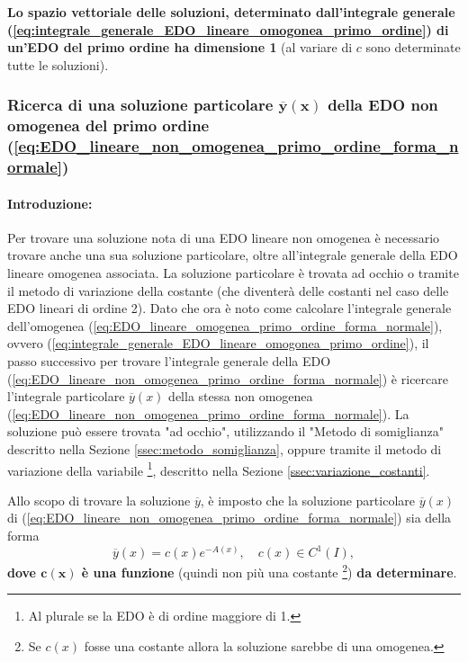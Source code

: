 \begin{remark}
    \textbf{Lo spazio vettoriale delle soluzioni, determinato dall'integrale generale (\ref{eq:integrale_generale_EDO_lineare_omogonea_primo_ordine}) di un'EDO del primo ordine ha dimensione 1} (al variare di $c$ sono determinate tutte le soluzioni).
\end{remark}

\subsubsection{Ricerca di una soluzione particolare \texorpdfstring{$\boldsymbol{\overline{y}(x)}$}{y(x)} della EDO non omogenea del primo ordine (\ref{eq:EDO_lineare_non_omogenea_primo_ordine_forma_normale})}
\paragraph{Introduzione:} Per trovare una soluzione nota di una EDO lineare non omogenea è necessario trovare anche una sua soluzione particolare, oltre all'integrale generale della EDO lineare omogenea associata. La soluzione particolare è trovata ad occhio o tramite il metodo di variazione della costante (che diventerà delle costanti nel caso delle EDO lineari di ordine 2).
Dato che ora è noto come calcolare l'integrale generale dell'omogenea (\ref{eq:EDO_lineare_omogenea_primo_ordine_forma_normale}), ovvero (\ref{eq:integrale_generale_EDO_lineare_omogonea_primo_ordine}), il passo successivo per trovare l'integrale generale della EDO (\ref{eq:EDO_lineare_non_omogenea_primo_ordine_forma_normale}) è ricercare l'integrale particolare $\overline{y}(x)$ della stessa non omogenea (\ref{eq:EDO_lineare_non_omogenea_primo_ordine_forma_normale}). La soluzione può essere trovata "ad occhio", utilizzando il "Metodo di somiglianza" descritto nella Sezione \ref{ssec:metodo_somiglianza}, oppure tramite il metodo di variazione della variabile \footnote{Al plurale se la EDO è di ordine maggiore di 1.}, descritto nella Sezione \ref{ssec:variazione_costanti}.

Allo scopo di trovare la soluzione $\overline y$, è imposto che la soluzione particolare $\overline{y}(x)$ di (\ref{eq:EDO_lineare_non_omogenea_primo_ordine_forma_normale}) sia della forma 
\begin{equation}\label{eq:forma_soluzione_paricolare_edo_non_omogenea_ordine_1}
    \overline{y}(x) = c(x)e^{-A(x)},\quad c(x)\in C^1(I),
\end{equation}
\textbf{dove $\boldsymbol{c(x)}$ è una funzione} (quindi non più una costante \footnote{Se $c(x)$ fosse una costante allora la soluzione sarebbe di una omogenea.}) \textbf{da determinare}.

